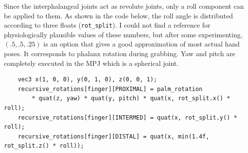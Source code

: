 \documentclass[hyperref, bachelorofscience]{cgvpub}
\begin{document}
Since the interphalangeal joints act as revolute joints, only a roll component can be applied to them. As shown in the code below, the roll angle is distributed according to three floats (\lstinline|rot_split|). I could not find a reference for physiologically plausible values of these numbers, but after some experimenting, $ (.5, .5, .25) $ is an option that gives a good approximation of most actual hand poses. It corresponds to phalanx rotation during grabbing. Yaw and pitch are completely executed in the \gls{MPJ} which is a spherical joint. 
\vspace{.3cm}
\begin{lstlisting}
	vec3 x(1, 0, 0), y(0, 1, 0), z(0, 0, 1);
	recursive_rotations[finger][PROXIMAL] = palm_rotation
		* quat(z, yaw) * quat(y, pitch) * quat(x, rot_split.x() * roll);
	recursive_rotations[finger][INTERMED] = quat(x, rot_split.y() * roll);
	recursive_rotations[finger][DISTAL] = quat(x, min(1.4f, rot_split.z() * roll));
\end{lstlisting}
\end{document}
